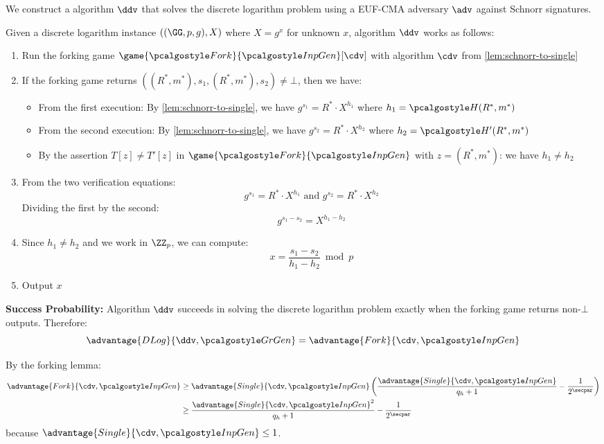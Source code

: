 \ifsolutions
\begin{mysolution}
  We construct a \ppt algorithm $\ddv$ that solves the discrete logarithm problem using a \ppt EUF-CMA adversary $\adv$ against Schnorr signatures.
  
  Given a discrete logarithm instance $((\GG, p, g), X)$ where $X = g^x$ for unknown $x$, algorithm $\ddv$ works as follows:
  \begin{enumerate}
    \item Run the forking game $\game{\algo{Fork}}{\algo{InpGen}}[\cdv]$ with algorithm $\cdv$ from \autoref{lem:schnorr-to-single}
    \item If the forking game returns $((R^*, m^*), s_1, (R^*, m^*), s_2) \neq \bot$, then we have:
    \begin{itemize}
      \item From the first execution: By \autoref{lem:schnorr-to-single}, we have $g^{s_1} = R^* \cdot X^{h_1}$ where $h_1 = \algo{H}(R^*, m^*)$
      \item From the second execution: By \autoref{lem:schnorr-to-single}, we have $g^{s_2} = R^* \cdot X^{h_2}$ where $h_2 = \algo{H}'(R^*, m^*)$
      \item By the assertion $T[z] \neq T'[z]$ in $\game{\algo{Fork}}{\algo{InpGen}}$ with $z = (R^*, m^*)$: we have $h_1 \neq h_2$
    \end{itemize}
    \item From the two verification equations:
    \[
      g^{s_1} = R^* \cdot X^{h_1} \text{ and } g^{s_2} = R^* \cdot X^{h_2}
    \]
    Dividing the first by the second:
    \[
      g^{s_1 - s_2} = X^{h_1 - h_2}
    \]
    \item Since $h_1 \neq h_2$ and we work in $\ZZ_p$, we can compute:
    \[
      x = \frac{s_1 - s_2}{h_1 - h_2} \bmod p
    \]
    \item Output $x$
  \end{enumerate}
  
  \textbf{Success Probability:} Algorithm $\ddv$ succeeds in solving the discrete logarithm problem exactly when the forking game returns non-$\bot$ outputs. Therefore:
  \[
    \advantage{DLog}{\ddv, \grgen} = \advantage{Fork}{\cdv, \algo{InpGen}}
  \]
  
  By the forking lemma:
  \begin{align*}
    \advantage{Fork}{\cdv, \algo{InpGen}} &\geq \advantage{Single}{\cdv, \algo{InpGen}} \left( \frac{\advantage{Single}{\cdv, \algo{InpGen}}}{q_h + 1} - \frac{1}{2^\secpar} \right)\\
    &\geq  \frac{\advantage{Single}{\cdv, \algo{InpGen}}^2}{q_h + 1} - \frac{1}{2^\secpar}\\
  \end{align*}
  because $\advantage{Single}{\cdv, \algo{InpGen}} \leq 1$.
  

\end{mysolution}
